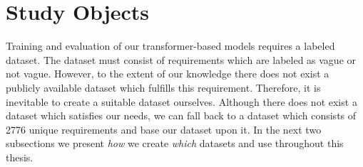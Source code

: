 \section{Study Objects}
\label{chp:study:sec:study_objects}


Training and evaluation of our transformer-based models requires a labeled dataset.
The dataset must consist of requirements which are labeled as vague or not vague.
However, to the extent of our knowledge there does not exist a publicly available dataset which fulfills this requirement.
Therefore, it is inevitable to create a suitable dataset ourselves.
Although there does not exist a dataset which satisfies our needs, we can fall back to a dataset which consists of 2776 unique requirements \parencite{Kummeth:2020} and base our dataset upon it.
In the next two subsections we present \textit{how} we create \textit{which} datasets and use throughout this thesis.



